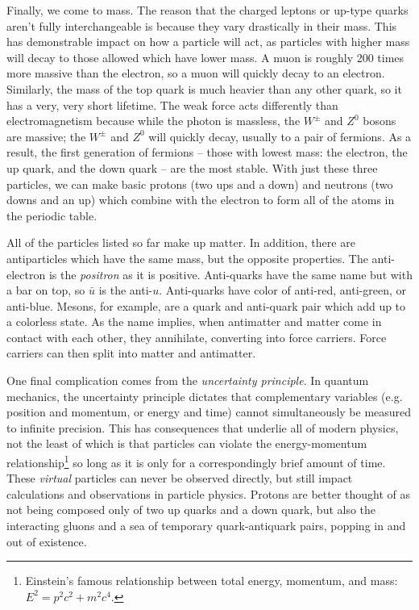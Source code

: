 Finally, we come to mass. The reason that the charged leptons or up-type quarks aren't fully interchangeable is because they vary drastically in their mass. This has demonstrable impact on how a particle will act, as particles with higher mass will decay to those allowed which have lower mass. A muon is roughly 200 times more massive than the electron, so a muon will quickly decay to an electron. Similarly, the mass of the top quark is much heavier than any other quark, so it has a very, very short lifetime. The weak force acts differently than electromagnetism because while the photon is massless, the $W^{\pm}$ and $Z^{0}$ bosons are massive; the $W^{\pm}$ and $Z^{0}$ will quickly decay, usually to a pair of fermions. As a result, the first generation of fermions -- those with lowest mass: the electron, the up quark, and the down quark -- are the most stable. With just these three particles, we can make basic protons (two ups and a down) and neutrons (two downs and an up) which combine with the electron to form all of the atoms in the periodic table.

All of the particles listed so far make up matter. In addition, there are antiparticles which have the same mass, but the opposite properties. The anti-electron is the \textit{positron} as it is positive. Anti-quarks have the same name but with a bar on top, so $\bar{u}$ is the anti-$u$. Anti-quarks have color of anti-red, anti-green, or anti-blue. Mesons, for example, are a quark and anti-quark pair which add up to a colorless state. As the name implies, when antimatter and matter come in contact with each other, they annihilate, converting into force carriers. Force carriers can then split into matter and antimatter.

One final complication comes from the \textit{uncertainty principle}. In quantum mechanics, the uncertainty principle dictates that complementary variables (e.g. position and momentum, or energy and time) cannot simultaneously be measured to infinite precision. This has consequences that underlie all of modern physics, not the least of which is that particles can violate the energy-momentum relationship\footnote{Einstein's famous relationship between total energy, momentum, and mass: $E^2=p^2c^2 + m^2c^4$.} so long as it is only for a correspondingly brief amount of time. These \textit{virtual} particles can never be observed directly, but still impact calculations and observations in particle physics. Protons are better thought of as not being composed only of two up quarks and a down quark, but also the interacting gluons and a sea of temporary quark-antiquark pairs, popping in and out of existence.

